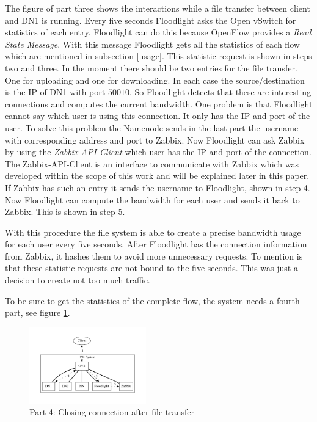 The figure of part three shows the interactions while a file transfer between client and DN1 is running. Every five seconds Floodlight asks the Open vSwitch for statistics of each entry. Floodlight can do this because OpenFlow provides a \textit{Read State Message}\cite[p. 30]{ofspec}. With this message Floodlight gets all the statistics of each flow which are mentioned in subsection \ref{usage}. This statistic request is shown in steps two and three. In the moment there should be two entries for the file transfer. One for uploading and one for downloading. In each case the source/destination is the IP of DN1 with port $50010$. So Floodlight detects that these are interesting connections and computes the current bandwidth. One problem is that Floodlight cannot say which user is using this connection. It only has the IP and port of the user. To solve this problem the Namenode sends in the last part the username with corresponding address and port to Zabbix. Now Floodlight can ask Zabbix by using the \textit{Zabbix-API-Client} which user has the IP and port of the connection. The Zabbix-API-Client is an interface to communicate with Zabbix which was developed within the scope of this work and will be explained later in this paper. If Zabbix has such an entry it sends the username to Floodlight, shown in step 4. Now Floodlight can compute the bandwidth for each user and sends it back to Zabbix. This is shown in step 5.

With this procedure the file system is able to create a precise bandwidth usage for each user every five seconds. After Floodlight has the connection information from Zabbix, it hashes them to avoid more unnecessary requests. To mention is that these statistic requests are not bound to the five seconds. This was just a decision to create not too much traffic.

To be sure to get the statistics of the complete flow, the system needs a fourth part, see figure \ref{cc}.  

\begin{figure}[htp]
\centering
\includegraphics[width=0.45\textwidth]{img/closeConnection} 
\caption{Part 4: Closing connection after file transfer}
\label{cc}
\end{figure}

